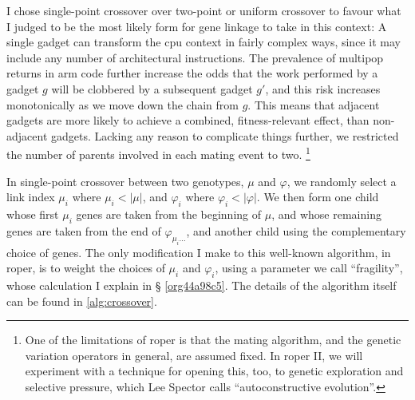 \documentclass[12pt,glossary]{dalthesis}
\begin{document}
I chose single-point crossover over two-point or uniform crossover to favour
what I judged to be the most likely form for gene linkage to take in this
context: A single gadget can transform the \gls{cpu} context in fairly complex
ways, since it may include any number of architectural instructions. The
prevalence of multipop returns in \gls{arm} code further increase the odds that
the work performed by a gadget \(g\) will be clobbered by a subsequent gadget
\(g'\), and this risk increases monotonically as we move down the chain from \(g\).
This means that adjacent gadgets are more likely to achieve a combined,
fitness-relevant effect, than non-adjacent gadgets. Lacking any reason to
complicate things further, we restricted the number of parents involved in each
mating event to two. \footnote{One of the limitations of \gls{roper} is that the mating
algorithm, and the genetic variation operators in general, are assumed fixed. In
\gls{roper} II, we will experiment with a technique for opening this, too, to
genetic exploration and selective pressure, which Lee Spector calls
``autoconstructive evolution''.}


In single-point crossover between two genotypes, \(\mu\) and \(\varphi\), we
randomly select a link index \(\mu_i\) where \(\mu_i < |\mu|\), and \(\varphi_i\)
where \(\varphi_i < |\varphi|\). We then form one child whose first \(\mu_i\) genes
are taken from the beginning of \(\mu\), and whose remaining genes are taken from
the end of \(\varphi_{\mu_i\dots}\), and another child using the complementary
choice of genes. The only modification I make to this well-known algorithm, in
\gls{roper}, is to weight the choices of \(\mu_i\) and \(\varphi_i\), using a
parameter we call ``fragility'', whose calculation I explain in \S
\ref{org44a98c5}. The details of the algorithm itself can be found in
\ref{alg:crossover}.
\end{document}
